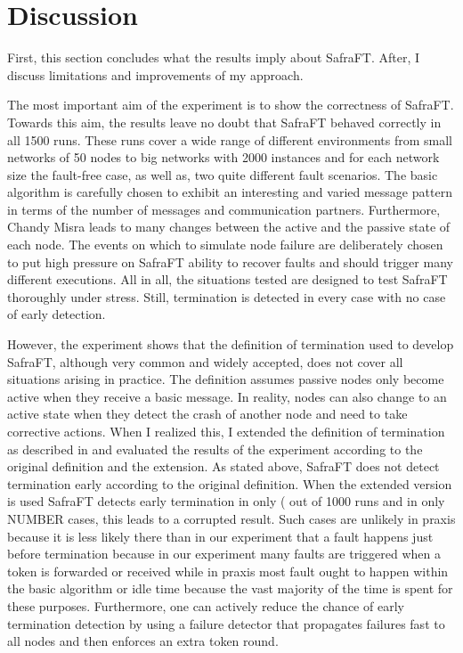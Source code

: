 \section{Discussion}
First, this section concludes what the results imply about SafraFT. After, I discuss limitations and improvements of my approach.

The most important aim of the experiment is to show the correctness of SafraFT.
Towards this aim, the results leave no doubt that SafraFT behaved correctly in all 1500 %
runs.
These runs cover a wide range of different environments from small networks of 50 nodes to big networks with 2000 instances and for each network size the fault-free case, as well as, two quite different fault scenarios.
The basic algorithm is carefully chosen to exhibit an interesting and varied message pattern in terms of the number of messages and communication partners.
Furthermore, Chandy Misra leads to many changes between the active and the passive state of each node.
The events on which to simulate node failure are deliberately chosen to put high pressure on SafraFT ability to recover faults and should trigger many different executions.
All in all, the situations tested are designed to test SafraFT thoroughly under stress.
Still, termination is detected in every case with no case of early detection.

However, the experiment shows that the definition of termination used to develop SafraFT, although very common and widely accepted, does not cover all situations arising in practice.
The definition assumes passive nodes only become active when they receive a basic message.
In reality, nodes can also change to an active state when they detect the crash of another node and need to take corrective actions.
When I realized this, I extended the definition of termination as described in \label{extended-definition} and evaluated the results of the experiment according to the original definition and the extension.
As stated above, SafraFT does not detect termination early according to the original definition.
When the extended version is used SafraFT detects early termination in only ( out of 1000 runs and in only NUMBER cases, this leads to a corrupted result. %
Such cases are unlikely in praxis because it is less likely there than in our experiment that a fault happens just before termination because in our experiment many faults are triggered when a token is forwarded or received while in praxis most fault ought to happen within the basic algorithm or idle time because the vast majority of the time is spent for these purposes.
Furthermore, one can actively reduce the chance of early termination detection by using a failure detector that propagates failures fast to all nodes and then enforces an extra token round.


